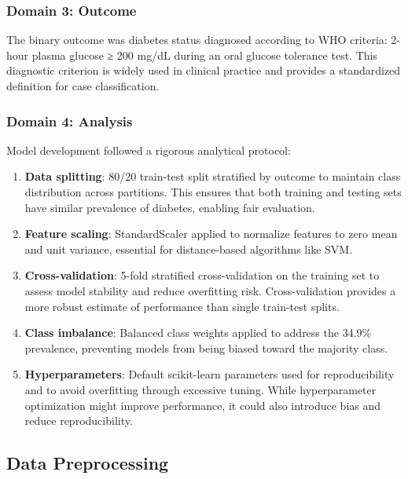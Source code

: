 \subsubsection{Domain 3: Outcome}

The binary outcome was diabetes status diagnosed according to WHO criteria: 
2-hour plasma glucose ≥ 200 mg/dL during an oral glucose tolerance test. 
This diagnostic criterion is widely used in clinical practice and provides 
a standardized definition for case classification.

\subsubsection{Domain 4: Analysis}

Model development followed a rigorous analytical protocol:

\begin{enumerate}[leftmargin=*]
    \item \textbf{Data splitting}: 80/20 train-test split stratified by 
          outcome to maintain class distribution across partitions. This 
          ensures that both training and testing sets have similar 
          prevalence of diabetes, enabling fair evaluation.
    \item \textbf{Feature scaling}: StandardScaler applied to normalize 
          features to zero mean and unit variance, essential for distance-based 
          algorithms like SVM.
    \item \textbf{Cross-validation}: 5-fold stratified cross-validation on 
          the training set to assess model stability and reduce overfitting 
          risk. Cross-validation provides a more robust estimate of 
          performance than single train-test splits.
    \item \textbf{Class imbalance}: Balanced class weights applied to 
          address the 34.9\% prevalence, preventing models from being biased 
          toward the majority class.
    \item \textbf{Hyperparameters}: Default scikit-learn parameters used 
          for reproducibility and to avoid overfitting through excessive 
          tuning. While hyperparameter optimization might improve 
          performance, it could also introduce bias and reduce 
          reproducibility.
\end{enumerate}

\subsection{Data Preprocessing}


